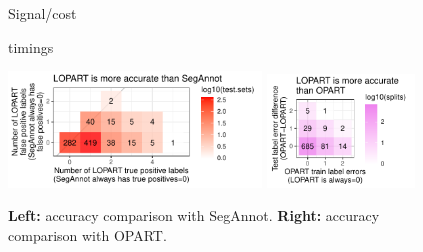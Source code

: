 \documentclass[12pt]{article}
\begin{document}
\begin{figure}
  
  \caption{Signal/cost}
  \label{fig:signal-cost}
\end{figure}

\begin{figure}
  
  
  \caption{timings}
  \label{fig:timings}
\end{figure}

\begin{figure}
  \centering
  \includegraphics[width=0.6\textwidth]{figure-label-errors-SegAnnot}
  \includegraphics[width=0.35\textwidth]{figure-label-errors}
  \caption{\textbf{Left:} accuracy comparison with
    SegAnnot. \textbf{Right:} accuracy comparison with OPART.}
  \label{fig:label-errors}
\end{figure}
\end{document}
